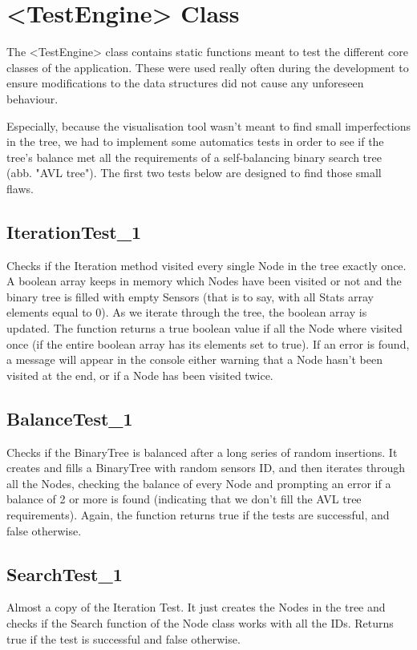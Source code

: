 \documentclass[10pt]{article}
\begin{document}
\section{<TestEngine> Class}
The <TestEngine> class contains static functions meant to test the different core classes of the application. These were used really often during the development to ensure modifications to the data structures did not cause any unforeseen behaviour.

Especially, because the visualisation tool wasn't meant to find small imperfections in the tree, we had to implement some automatics tests in order to see if the tree's balance met all the requirements of a self-balancing binary search tree (abb. "AVL tree"). The first two tests below are designed to find those small flaws.

\subsection{IterationTest\_1}
Checks if the Iteration method visited every single Node in the tree exactly once. A boolean array keeps in memory which Nodes have been visited or not and the binary tree is filled with empty Sensors (that is to say, with all Stats array elements equal to 0). As we iterate through the tree, the boolean array is updated. The function returns a true boolean value if all the Node where visited once (if the entire boolean array has its elements set to true). If an error is found, a message will appear in the console either warning that a Node hasn't been visited at the end, or if a Node has been visited twice.

\subsection{BalanceTest\_1}
Checks if the BinaryTree is balanced after a long series of random insertions. It creates and fills a BinaryTree with random sensors ID, and then iterates through all the Nodes, checking the balance of every Node and prompting an error if a balance of 2 or more is found (indicating that we don't fill the AVL tree requirements). Again, the function returns true if the tests are successful, and false otherwise.

\subsection{SearchTest\_1}
Almost a copy of the Iteration Test. It just creates the Nodes in the tree and checks if the Search function of the Node class works with all the IDs. Returns true if the test is successful and false otherwise.
\end{document}
